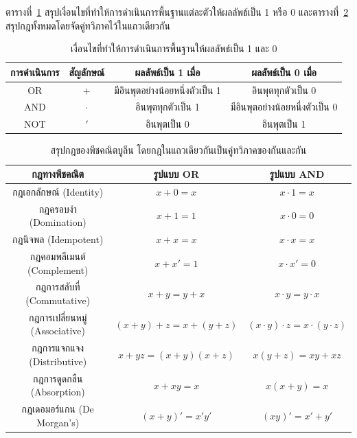ตารางที่~\ref{tab:boolean-op-summary} สรุปเงื่อนไขที่ทำให้การดำเนินการพื้นฐานแต่ละตัวให้ผลลัพธ์เป็น 1 หรือ 0 และตารางที่~\ref{tab:boolean-identities} สรุปกฎทั้งหมดโดยจัดคู่ทวิภาคไว้ในแถวเดียวกัน

\begin{table}[!htb]
\centering
\caption{เงื่อนไขที่ทำให้การดำเนินการพื้นฐานให้ผลลัพธ์เป็น 1 และ 0}
\label{tab:boolean-op-summary}
\begin{tabular}{|c|c|c|c|}
\hline
การดำเนินการ & สัญลักษณ์ & ผลลัพธ์เป็น 1 เมื่อ & ผลลัพธ์เป็น 0 เมื่อ \\
\hline
OR & $+$ & มีอินพุตอย่างน้อยหนึ่งตัวเป็น 1 & อินพุตทุกตัวเป็น 0 \\
\hline
AND & $\cdot$ & อินพุตทุกตัวเป็น 1 & มีอินพุตอย่างน้อยหนึ่งตัวเป็น 0 \\
\hline
NOT & $'$ & อินพุตเป็น 0 & อินพุตเป็น 1 \\
\hline
\end{tabular}
\end{table}

\begin{table}[!htb]
\centering
\caption{สรุปกฎของพีชคณิตบูลีน โดยกฎในแถวเดียวกันเป็นคู่ทวิภาคของกันและกัน}
\label{tab:boolean-identities}
\begin{tabular}{|c|c|c|}
\hline
กฎทางพีชคณิต & รูปแบบ OR & รูปแบบ AND \\
\hline
กฎเอกลักษณ์ (Identity) & $x + 0 = x$ & $x \cdot 1 = x$ \\
\hline
กฎครอบงำ (Domination) & $x + 1 = 1$ & $x \cdot 0 = 0$ \\
\hline
กฎนิจพล (Idempotent) & $x + x = x$ & $x \cdot x = x$ \\
\hline
กฎคอมพลีเมนต์ (Complement) & $x + x' = 1$ & $x \cdot x' = 0$ \\
\hline
กฎการสลับที่ (Commutative) & $x + y = y + x$ & $x \cdot y = y \cdot x$ \\
\hline
กฎการเปลี่ยนหมู่ (Associative) & $(x + y) + z = x + (y + z)$ & $(x \cdot y) \cdot z = x \cdot (y \cdot z)$ \\
\hline
กฎการแจกแจง (Distributive) & $x + yz = (x + y)(x + z)$ & $x(y + z) = xy + xz$ \\
\hline
กฎการดูดกลืน (Absorption) & $x + xy = x$ & $x(x + y) = x$ \\
\hline
กฎเดอมอร์แกน (De Morgan's) & $(x + y)' = x' y'$ & $(xy)' = x' + y'$ \\
\hline
\end{tabular}
\end{table}

